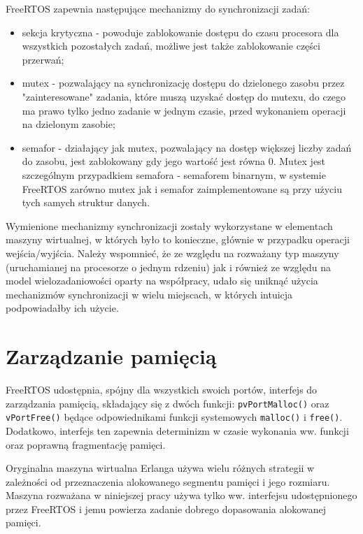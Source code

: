 FreeRTOS zapewnia następujące mechanizmy do synchronizacji zadań:
\begin{itemize}
\item sekcja krytyczna - powoduje zablokowanie dostępu do czasu procesora dla wszystkich pozostałych zadań, możliwe jest także zablokowanie części przerwań;
\item mutex - pozwalający na synchronizację dostępu do dzielonego zasobu przez "zainteresowane" zadania, które muszą uzyskać dostęp do mutexu, do czego ma prawo tylko jedno zadanie w jednym czasie, przed wykonaniem operacji na dzielonym zasobie;
\item semafor - działający jak mutex, pozwalający na dostęp większej liczby zadań do zasobu, jest zablokowany gdy jego wartość jest równa 0. Mutex jest szczególnym przypadkiem semafora - semaforem binarnym, w systemie FreeRTOS zarówno mutex jak i semafor zaimplementowane są przy użyciu tych samych struktur danych.
\end{itemize}

Wymienione mechanizmy synchronizacji zostały wykorzystane w elementach maszyny wirtualnej, w których było to konieczne, głównie w przypadku operacji wejścia/wyjścia.
Należy wspomnieć, że ze względu na rozważany typ maszyny (uruchamianej na procesorze o jednym rdzeniu) jak i również ze względu na model wielozadaniowości oparty na współpracy, udało się uniknąć użycia mechanizmów synchronizacji w wielu miejscach, w których intuicja podpowiadałby ich użycie.

\section{Zarządzanie pamięcią}
\label{sec:rtosPamiec}

FreeRTOS udostępnia, spójny dla wszystkich swoich portów, interfejs do zarządzania pamięcią, składający się z dwóch funkcji: \texttt{pvPortMalloc()} oraz \texttt{vPortFree()} będące odpowiednikami funkcji systemowych \texttt{malloc()} i \texttt{free()}. Dodatkowo, interfejs ten zapewnia determinizm w czasie wykonania ww. funkcji oraz poprawną fragmentację pamięci.

Oryginalna maszyna wirtualna Erlanga używa wielu różnych strategii w zależności od przeznaczenia alokowanego segmentu pamięci i jego rozmiaru. Maszyna rozważana w niniejszej pracy używa tylko ww. interfejsu udostępnionego przez FreeRTOS i jemu powierza zadanie dobrego dopasowania alokowanej pamięci.

